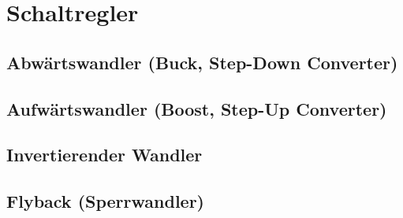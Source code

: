 \section{Schaltregler}


\subsection{Abwärtswandler (Buck, Step-Down Converter)}

\begin{minipage}[c]{0.4\columnwidth}
    
\end{minipage}
\hfill
\begin{minipage}[c]{0.58\columnwidth}
    
\end{minipage}


\subsection{Aufwärtswandler (Boost, Step-Up Converter)}

\begin{minipage}[c]{0.4\columnwidth}
    
\end{minipage}
\hfill
\begin{minipage}[c]{0.58\columnwidth}
    
\end{minipage}


\subsection{Invertierender Wandler}

\begin{minipage}[c]{0.4\columnwidth}
    
\end{minipage}
\hfill
\begin{minipage}[c]{0.58\columnwidth}
    
\end{minipage}


\subsection{Flyback (Sperrwandler)}

\begin{minipage}[c]{0.4\columnwidth}
    
\end{minipage}
\hfill
\begin{minipage}[c]{0.58\columnwidth}
    
\end{minipage}